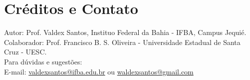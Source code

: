 \section{Créditos e Contato}\label{sec:contatos}
\noindent Autor: Prof. Valdex Santos, Instituo Federal da Bahia - IFBA, Campus Jequié.\\
Colaborador: Prof. Francisco B. S. Oliveira - Universidade Estadual de Santa Cruz - UESC.\\
Para dúvidas e sugestões:\\
E-mail: \href{valdexsantos@ifba.edu.br}{valdexsantos@ifba.edu.br} ou \href{waldexsantos@gmail.com}{waldexsantos@gmail.com}\\

